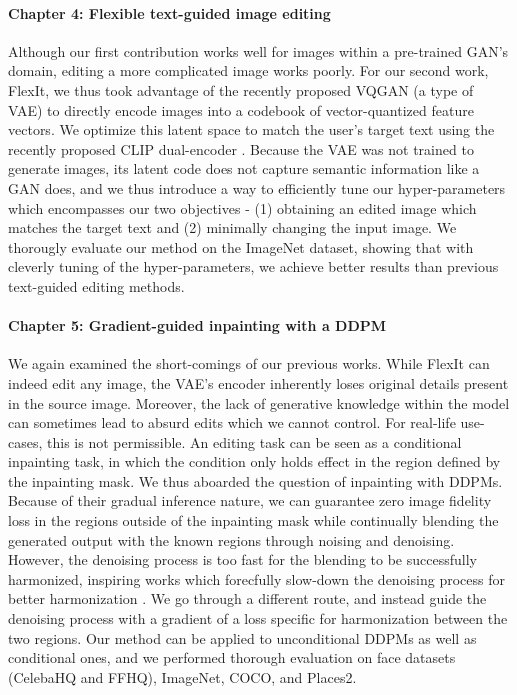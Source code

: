 \paragraph{Chapter 4: Flexible text-guided image editing}

Although our first contribution works well for images within a pre-trained \ac{GAN}'s  domain, 
editing a more complicated image works poorly. For our second work, FlexIt, we thus took advantage of the 
recently proposed  VQGAN \citep{esser2021taming} (a type of \ac{VAE}) to directly encode images into a codebook of vector-quantized
feature vectors. We optimize this latent space to match the user's target text using the recently proposed 
CLIP dual-encoder \citep{radford2021learning}. Because the \ac{VAE} was not trained to generate images,
its latent code does not capture semantic information like a \ac{GAN} does, and we thus introduce
 a way to efficiently tune our hyper-parameters 
 which encompasses our two 
objectives - (1) obtaining an edited image which matches the target text and (2) minimally changing 
the input image. We thorougly evaluate our method on the ImageNet dataset, showing that with cleverly
tuning of the hyper-parameters, we achieve better results than previous text-guided editing methods.


\paragraph{Chapter 5: Gradient-guided inpainting with a \ac{DDPM}}

We again examined the short-comings of our previous works. While FlexIt can indeed edit any image, 
the \ac{VAE}'s encoder inherently loses original details present in the source image. Moreover,
the lack of generative knowledge within the model can sometimes lead to absurd edits which 
we cannot control. For real-life 
use-cases, this is not permissible. An editing task can be seen as a conditional inpainting 
task, in which the condition only holds effect in the region defined by the inpainting mask. We thus 
aboarded the question of inpainting with \ac{DDPM}s. Because of their gradual inference nature, we can 
guarantee zero image fidelity loss in the regions outside of the inpainting mask while continually 
blending the generated output with the known regions through noising and denoising. However, the 
denoising process is too fast for the blending to be successfully harmonized, inspiring works which 
forecfully slow-down the denoising process for better harmonization \citep{lugmayr2022repaint}. We 
go through a different route, and instead guide the denoising process with a gradient of a loss 
specific for harmonization between the two regions. Our method can be applied to unconditional \ac{DDPM}s 
as well as conditional ones, and we performed thorough evaluation on face datasets (CelebaHQ and FFHQ),
 ImageNet, COCO, 
and Places2. 



















